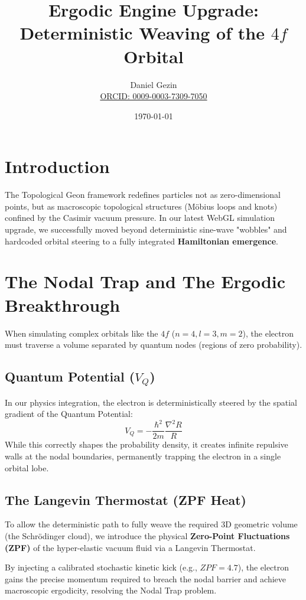\documentclass{article}
\title{Ergodic Engine Upgrade: \\ Deterministic Weaving of the $4f$ Orbital}
\author{Daniel Gezin \\ \href{https://orcid.org/0009-0003-7309-7050}{ORCID: 0009-0003-7309-7050}}
\date{\today}
\begin{document}
\maketitle

\section{Introduction}
The Topological Geon framework redefines particles not as zero-dimensional points, but as macroscopic topological structures (Möbius loops and knots) confined by the Casimir vacuum pressure. In our latest WebGL simulation upgrade, we successfully moved beyond deterministic sine-wave "wobbles" and hardcoded orbital steering to a fully integrated \textbf{Hamiltonian emergence}.

\section{The Nodal Trap and The Ergodic Breakthrough}
When simulating complex orbitals like the $4f$ ($n=4, l=3, m=2$), the electron must traverse a volume separated by quantum nodes (regions of zero probability).

\subsection{Quantum Potential ($V_Q$)}
In our physics integration, the electron is deterministically steered by the spatial gradient of the Quantum Potential:
\begin{equation}
    V_Q = -\frac{\hbar^2}{2m} \frac{\nabla^2 R}{R}
\end{equation}
While this correctly shapes the probability density, it creates infinite repulsive walls at the nodal boundaries, permanently trapping the electron in a single orbital lobe.

\subsection{The Langevin Thermostat (ZPF Heat)}
To allow the deterministic path to fully weave the required 3D geometric volume (the Schrödinger cloud), we introduce the physical \textbf{Zero-Point Fluctuations (ZPF)} of the hyper-elastic vacuum fluid via a Langevin Thermostat.

By injecting a calibrated stochastic kinetic kick (e.g., $ZPF = 4.7$), the electron gains the precise momentum required to breach the nodal barrier and achieve macroscopic ergodicity, resolving the Nodal Trap problem.
\end{document}
